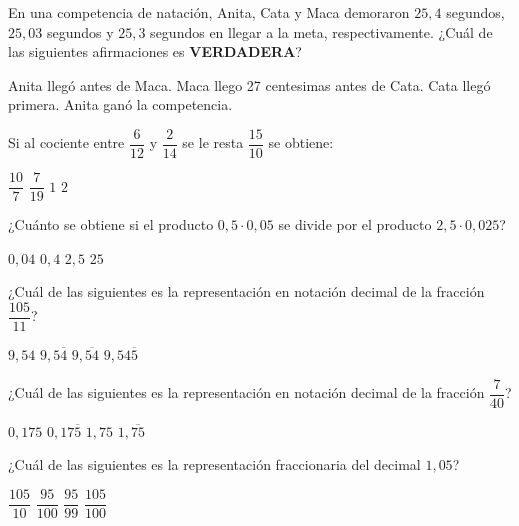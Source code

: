 \documentclass[spanish,letterpaper, 12pt, addpoints, answers]{exam}
\begin{document}
\begin{questions}
\newpage
    \question[1] En una competencia de natación, Anita, Cata y Maca demoraron $25,4$ segundos, $25,03$ segundos y $25,3$ segundos en llegar a la meta, respectivamente. ¿Cuál de las siguientes afirmaciones es \textbf{VERDADERA}?
    \begin{choices}
        \choice Anita llegó antes de Maca.
        \choice Maca llego 27 centesimas antes de Cata.
        \CorrectChoice Cata llegó primera.
        \choice Anita ganó la competencia.
    \end{choices}
    \vspace{0.15in}

    \question[1] Si al cociente entre $\dfrac{6}{12}$ y $\dfrac{2}{14}$ se le resta $\dfrac{15}{10}$ se obtiene:

    \begin{choices}
        \choice $\dfrac{10}{7}$
        \choice $\dfrac{7}{19}$
        \choice $1$
        \CorrectChoice $2$
    \end{choices}

    \question[1] ¿Cuánto se obtiene si el producto $0,5\cdot 0,05$ se divide por el producto $2,5\cdot 0,025$?
    \begin{choices}
        \choice $0,04$
        \CorrectChoice $0,4$
        \choice $2,5$
        \choice $25$
    \end{choices}

    \question[1] ¿Cuál de las siguientes es la representación en notación decimal de la fracción $\dfrac{105}{11}$?
    \begin{choices}
        \choice $9,54$
        \choice $9,5\overline{4}$
        \CorrectChoice $9,\overline{54}$
        \choice $9,54\overline{5}$
    \end{choices}
    \vspace{0.15in}

    \question[1] ¿Cuál de las siguientes es la representación en notación decimal de la fracción $\dfrac{7}{40}$?
    \begin{choices}
        \CorrectChoice $0,175$
        \choice $0,17\overline{5}$
        \choice $1,75$
        \choice $1,\overline{75}$
    \end{choices}
    \vspace{0.15in}

\newpage
    \question[1] ¿Cuál de las siguientes es la representación fraccionaria del decimal $1,05$?
    \begin{choices}
        \choice $\dfrac{105}{10}$
        \choice $\dfrac{95}{100}$
        \choice $\dfrac{95}{99}$
        \CorrectChoice $\dfrac{105}{100}$
    \end{choices}
    \vspace{0.15in}


\end{questions}
\end{document}
